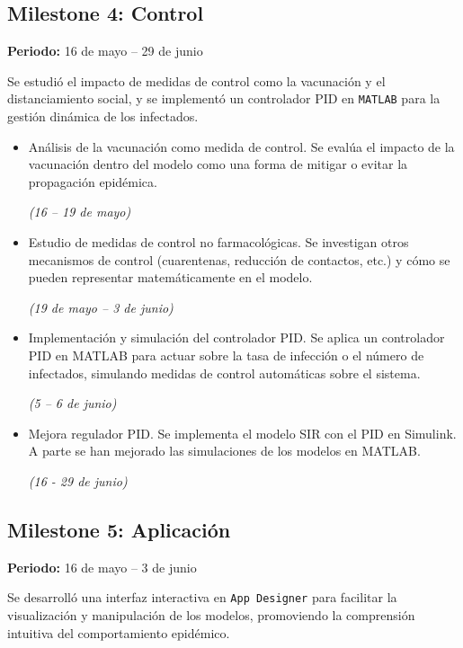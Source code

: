 \subsection*{Milestone 4: Control}
\textbf{Periodo:} 16 de mayo – 29 de junio

Se estudió el impacto de medidas de control como la vacunación y el distanciamiento social, y se implementó un controlador PID en \texttt{MATLAB} para la gestión dinámica de los infectados.

\begin{itemize}
    \item Análisis de la vacunación como medida de control. Se evalúa el impacto de la vacunación dentro del modelo como una forma de mitigar o evitar la propagación epidémica. 
    
    \textit{(16 – 19 de mayo)}
    \item Estudio de medidas de control no farmacológicas. Se investigan otros mecanismos de control (cuarentenas, reducción de contactos, etc.) y cómo se pueden representar matemáticamente en el modelo. 
    
    \textit{(19 de mayo – 3 de junio)}
    \item Implementación y simulación del controlador PID. Se aplica un controlador PID en MATLAB para actuar sobre la tasa de infección o el número de infectados, simulando medidas de control automáticas sobre el sistema.
    
    \textit{(5 – 6 de junio)}

    \item  Mejora regulador PID. Se implementa el modelo SIR con el PID en Simulink. A parte se han mejorado las simulaciones de los modelos en MATLAB.

    \textit{(16 - 29 de junio)}
    
\end{itemize}

\subsection*{Milestone 5: Aplicación}
\textbf{Periodo:} 16 de mayo – 3 de junio

Se desarrolló una interfaz interactiva en \texttt{App Designer} para facilitar la visualización y manipulación de los modelos, promoviendo la comprensión intuitiva del comportamiento epidémico.

